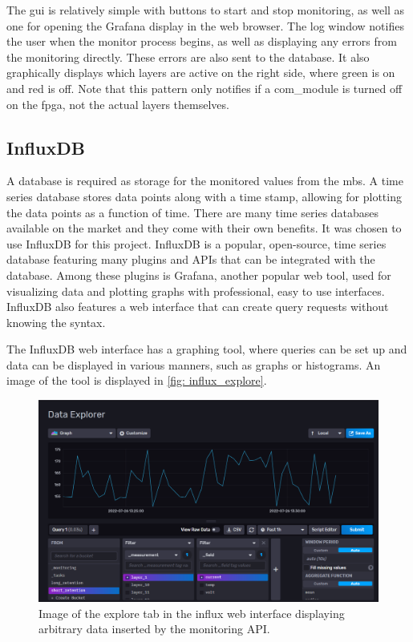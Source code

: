 \documentclass[main.tex]{subfiles}
\begin{document}
The \gls{gui} is relatively simple with buttons to start and stop monitoring, as well as one for opening the Grafana display in the web browser. The log window notifies the user when the monitor process begins, as well as displaying any errors from the monitoring directly. These errors are also sent to the database. It also graphically displays which layers are active on the right side, where green is on and red is off. Note that this pattern only notifies if a com\_module is turned off on the \gls{fpga}, not the actual layers themselves.

\subsection{InfluxDB}
\label{ssec: influxdb}
A database is required as storage for the monitored values from the \gls{mb}s. A time series database stores data points along with a time stamp, allowing for plotting the data points as a function of time. There are many time series databases available on the market and they come with their own benefits. It was chosen to use InfluxDB for this project. InfluxDB is a popular, open-source, time series database featuring many plugins and APIs that can be integrated with the database. Among these plugins is Grafana, another popular web tool, used for visualizing data and plotting graphs with professional, easy to use interfaces. InfluxDB also features a web interface that can create query requests without knowing the syntax.

The InfluxDB web interface has a graphing tool, where queries can be set up and data can be displayed in various manners, such as graphs or histograms. An image of the tool is displayed in \autoref{fig: influx_explore}.

\begin{figure}[!htpb]
    \centering
    \includegraphics[width=17cm, scale=4]{images/influx_explore.png}
    \caption{Image of the explore tab in the influx web interface displaying arbitrary data inserted by the monitoring API.}
    \label{fig: influx_explore}
\end{figure}
\FloatBarrier
\end{document}
